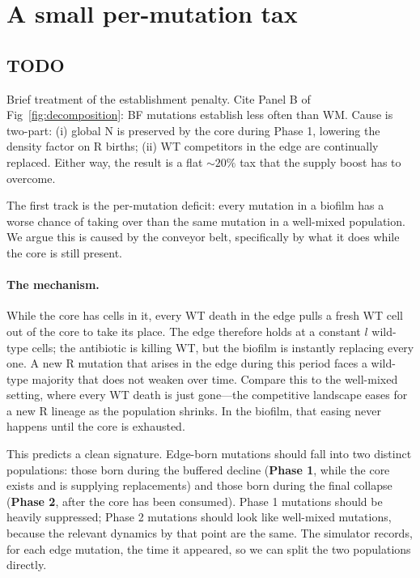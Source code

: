 \documentclass[11pt]{article}
\begin{document}
\section{A small per-mutation tax}

\subsection{TODO}

Brief treatment of the establishment penalty. Cite Panel B of
Fig~\ref{fig:decomposition}: BF mutations establish less often than
WM. Cause is two-part: (i) global N is preserved by the core during
Phase 1, lowering the density factor on R births; (ii) WT
competitors in the edge are continually replaced. Either way, the
result is a flat $\sim 20\%$ tax that the supply boost has to overcome.


The first track is the per-mutation deficit: every mutation in a
biofilm has a worse chance of taking over than the same mutation in a
well-mixed population. We argue this is caused by the conveyor belt,
specifically by what it does while the core is still present.

\paragraph{The mechanism.} While the core has cells in it, every WT
death in the edge pulls a fresh WT cell out of the core to take its
place. The edge therefore holds at a constant $l$ wild-type cells; the
antibiotic is killing WT, but the biofilm is instantly replacing every
one. A new R mutation that arises in the edge during this period faces
a wild-type majority that does not weaken over time. Compare this to
the well-mixed setting, where every WT death is just gone---the
competitive landscape eases for a new R lineage as the population
shrinks. In the biofilm, that easing never happens until the core is
exhausted.

This predicts a clean signature. Edge-born mutations should fall into
two distinct populations: those born during the buffered decline
(\textbf{Phase 1}, while the core exists and is supplying replacements)
and those born during the final collapse (\textbf{Phase 2}, after the
core has been consumed). Phase 1 mutations should be heavily
suppressed; Phase 2 mutations should look like well-mixed mutations,
because the relevant dynamics by that point are the same. The simulator
records, for each edge mutation, the time it appeared, so we can split
the two populations directly.
\end{document}
